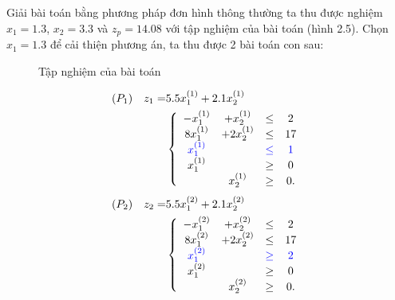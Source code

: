 \documentclass[12pt,a4paper]{report}
\begin{document}
    Giải bài toán bằng phương pháp đơn hình thông thường ta thu được nghiệm $x_1 =1.3$, $x_2 = 3.3$ và $z_p=14.08$ với tập nghiệm của bài toán (hình 2.5). Chọn $x_1=1.3$ để cải thiện phương án, ta thu được 2 bài toán con sau:
    \begin{figure}
	\center
    \caption{Tập nghiệm của bài toán}
    \end{figure}

    \begin{equation*}
        \begin{split}
            (P_1) \quad z_1= & 5.5x^{(1)}_1 + 2.1x^{(1)}_2 \\
            & \left\{\begin{array} {cccc}
            -x^{(1)}_1 &+ x^{(1)}_2 &\leq& 2 \\
            8x^{(1)}_1 &+ 2x^{(1)}_2 &\leq& 17 \\
            \color{blue} x^{(1)}_1 && \color{blue} \leq &\color{blue} 1 \\
            x^{(1)}_1 &&\geq& 0 \\
            &x^{(1)}_2 &\geq& 0. \\
            \end{array}\right. \\
        \end{split}
    \end{equation*}
   \begin{equation*}
        \begin{split}
            (P_2) \quad z_2= & 5.5x^{(2)}_1 + 2.1x^{(2)}_2  \\
            & \left\{\begin{array} {cccc}
            -x^{(2)}_1 &+ x^{(2)}_2 &\leq &2 \\
            8x^{(2)}_1 &+ 2x^{(2)}_2 &\leq &17 \\
            \color{blue} x^{(2)}_1 &&\color{blue}\geq&\color{blue} 2 \\
            x^{(2)}_1 &&\geq& 0 \\
            &x^{(2)}_2 &\geq& 0. \\
            \end{array}\right. \\
        \end{split}
    \end{equation*}
\end{document}
